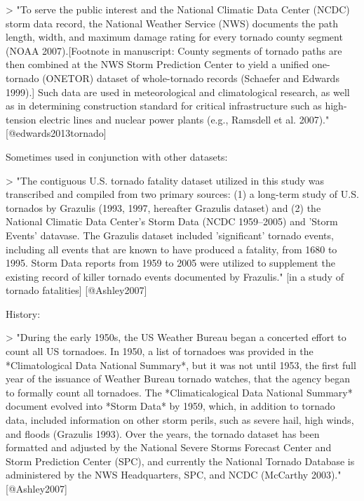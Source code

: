 > "To serve the public interest and the National Climatic Data Center (NCDC)
storm data record, the National Weather Service (NWS) documents the path length,
width, and maximum damage rating for every tornado county segment (NOAA
2007).[Footnote in manuscript: County segments of tornado paths are then
combined at the NWS Storm Prediction Center to yield a unified one-tornado
(ONETOR) dataset of whole-tornado records (Schaefer and Edwards 1999).] Such
data are used in meteorological and climatological research, as well as in
determining construction standard for critical infrastructure such as
high-tension electric lines and nuclear power plants (e.g., Ramsdell et al.
2007)." [@edwards2013tornado]

Sometimes used in conjunction with other datasets: 

> "The contiguous U.S. tornado fatality dataset utilized in this study was 
transcribed and compiled from two primary sources: (1) a long-term study of 
U.S. tornados by Grazulis (1993, 1997, hereafter Grazulis dataset) and 
(2) the National Climatic Data Center's Storm Data (NCDC 1959--2005) and 
'Storm Events' datavase. The Grazulis dataset included 'significant' tornado
events, including all events that are known to have produced a fatality, 
from 1680 to 1995. Storm Data reports from 1959 to 2005 were utilized to 
supplement the existing record of killer tornado events documented by 
Frazulis." [in a study of tornado fatalities] [@Ashley2007]

History: 

> "During the early 1950s, the US Weather Bureau began a concerted effort to
count all US tornadoes. In 1950, a list of tornadoes was provided in the
*Climatological Data National Summary*, but it was not until 1953, the first
full year of the issuance of Weather Bureau tornado watches, that the agency
began to formally count all tornadoes. The *Climaticalogical Data National
Summary* document evolved into *Storm Data* by 1959, which, in addition to
tornado data, included information on other storm perils, such as severe hail,
high winds, and floods (Grazulis 1993). Over the years, the tornado dataset has
been formatted and adjusted by the National Severe Storms Forecast Center and
Storm Prediction Center (SPC), and currently the National Tornado Database is
administered by the NWS Headquarters, SPC, and NCDC (McCarthy 2003)."
[@Ashley2007]
